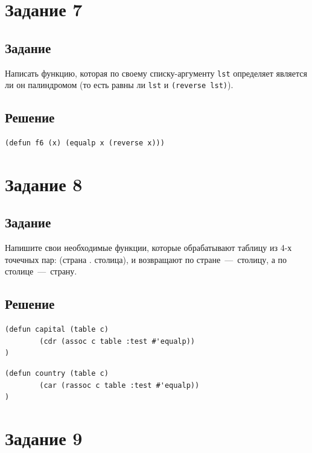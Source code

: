 \section{Задание 7}
\subsection*{Задание}
Написать функцию, которая по своему списку-аргументу \texttt{lst} определяет является ли он палиндромом (то есть равны ли \texttt{lst} и \texttt{(reverse lst)}).

\subsection*{Решение}
\begin{code}
\begin{verbatim}
(defun f6 (x) (equalp x (reverse x)))
\end{verbatim}
\end{code}


\section{Задание 8}
\subsection*{Задание}
Напишите свои необходимые функции, которые обрабатывают таблицу из 4-х точечных пар:
(страна . столица), и возвращают по стране~---~столицу, а по столице~---~страну.

\subsection*{Решение}
\begin{code}
\begin{verbatim}
(defun capital (table c)
        (cdr (assoc c table :test #'equalp))
)
\end{verbatim}
\end{code}

\begin{code}
\begin{verbatim}
(defun country (table c)
        (car (rassoc c table :test #'equalp))
)
\end{verbatim}
\end{code}

\section{Задание 9}
